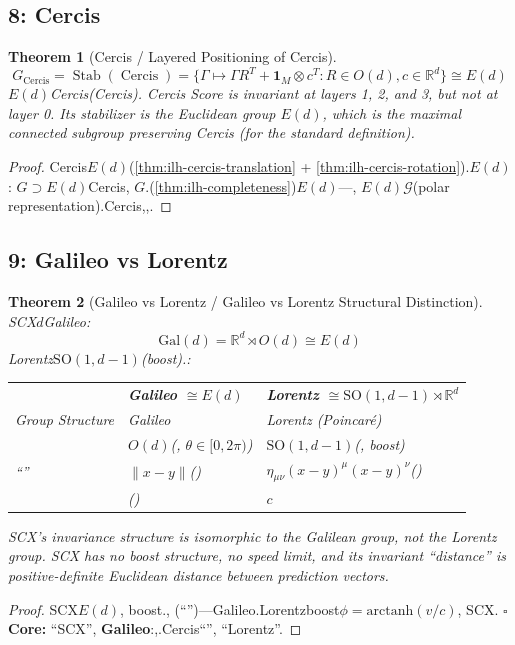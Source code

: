 \documentclass[11pt,a4paper]{article}
\theoremstyle{plain}
\newtheorem{theorem}{Theorem}[section]
\theoremstyle{definition}
\theoremstyle{remark}
\newcommand{\RR}{\mathbb{R}}
\newcommand{\cG}{\mathcal{G}}
\DeclareMathOperator{\Cercis}{Cercis}
\DeclareMathOperator{\Stab}{Stab}
\begin{document}
{\subsection{8: Cercis}
\begin{theorem}[Cercis / Layered Positioning of Cercis]
\label{thm:ilh-cercis-position}
\begin{equation}
\boxed{G_{\Cercis} = \Stab(\Cercis) = \{\Gamma \mapsto \Gamma R^T + \mathbf{1}_M \otimes c^T : R \in O(d), c \in \RR^d\} \cong E(d)}
\end{equation}
$E(d)$Cercis(Cercis).
\textit{Cercis Score is invariant at layers 1, 2, and 3, but not at layer 0. Its stabilizer is the Euclidean group $E(d)$, which is the maximal connected subgroup preserving Cercis (for the standard definition).}
\end{theorem}
\begin{proof}
Cercis$E(d)$(\ref{thm:ilh-cercis-translation} + \ref{thm:ilh-cercis-rotation}).$E(d)$: $G \supset E(d)$Cercis, $G$.(\ref{thm:ilh-completeness})$E(d)$---, $E(d)$$\cG$(polar representation).Cercis,,.
\end{proof}
\subsection{9: Galileo vs Lorentz}
\begin{theorem}[Galileo vs Lorentz / Galileo vs Lorentz Structural Distinction]
\label{thm:ilh-galileo}
SCX$d$Galileo: 
\begin{equation}
\boxed{\text{Gal}(d) = \RR^d \rtimes O(d) \cong E(d)}
\end{equation}
Lorentz$\text{SO}(1, d-1)$(boost).: 
\begin{table}[h]
\centering
\begin{tabular}{p{3cm} p{5cm} p{5cm}}
\toprule
 & \textbf{Galileo $\cong E(d)$} & \textbf{Lorentz $\cong \text{SO}(1, d-1) \rtimes \RR^{d}$} \\
\textit{Group Structure} & \textit{Galileo} & \textit{Lorentz (Poincar\'{e})} \\
\midrule
 & $O(d)$(, $\theta \in [0,2\pi)$) & $\text{SO}(1, d-1)$(, boost) \\
``'' & $\|x - y\|$() & $\eta_{\mu\nu}(x-y)^\mu(x-y)^\nu$() \\
 & () & $c$ \\
\bottomrule
\end{tabular}
\end{table}
\textit{SCX's invariance structure is isomorphic to the Galilean group, not the Lorentz group. SCX has no boost structure, no speed limit, and its invariant ``distance'' is positive-definite Euclidean distance between prediction vectors.}
\end{theorem}
\begin{proof}
SCX$E(d)$, boost., (``'')---Galileo.Lorentzboost$\phi = \text{arctanh}(v/c)$, SCX.
$\square$ \textbf{Core: } ``SCX'', \textbf{Galileo}:,.Cercis``'', ``Lorentz''.
\end{proof}
}
\end{document}
